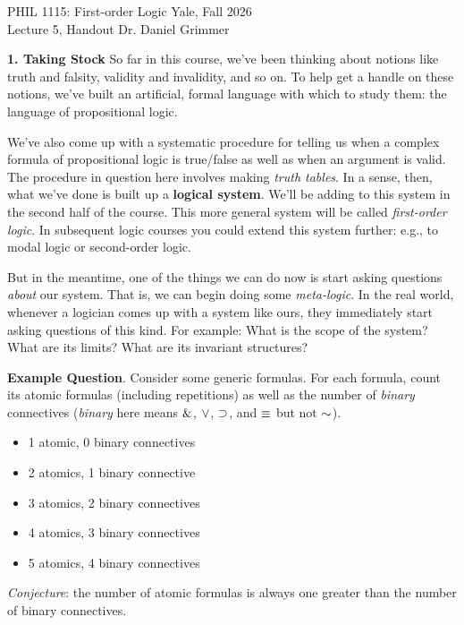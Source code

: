 \documentclass[options]{philosophersimprint}
\begin{document}
PHIL 1115: First-order Logic \hfill Yale, Fall 2026\\
Lecture 5, Handout \hfill Dr. Daniel Grimmer

\textbf{1. Taking Stock} So far in this course, we've been thinking about notions like truth and falsity, validity and invalidity, and so on. To help get a handle on these notions, we've built an artificial, formal language with which to study them: the language of propositional logic.

We've also come up with a systematic procedure for telling us when a complex formula of propositional logic is true/false as well as when an argument is valid. The procedure in question here involves making \textit{truth tables}. In a sense, then, what we've done is built up a \textbf{logical system}. We'll be adding to this system in the second half of the course. This more general system will be called \textit{first-order logic}. In subsequent logic courses you could extend this system further: e.g., to modal logic or second-order logic.

But in the meantime, one of the things we can do now is start asking questions \textit{about} our system. That is, we can begin doing some \textit{meta-logic}. In the real world, whenever a logician comes up with a system like ours, they immediately start asking questions of this kind. For example: What is the scope of the system? What are its limits? What are its invariant structures?

\textbf{Example Question}. Consider some generic formulas. For each formula, count its atomic formulas (including repetitions) as well as the number of \textit{binary} connectives (\textit{binary} here means $\mathbin{\&}$, $\mathbin{\vee}$, $\mathbin{\supset}$, and $\mathbin{\equiv}$ but not $\mathord{\sim}$).
\begin{itemize}
    \item {} 1 atomic, 0 binary connectives
    \item {} 2 atomics, 1 binary connective
    \item {} 3 atomics, 2 binary connectives
    \item {} 4 atomics, 3 binary connectives
    \item {} 5 atomics, 4 binary connectives
\end{itemize}
\textit{Conjecture}: the number of atomic formulas is always one greater than the number of binary connectives.
\end{document}
